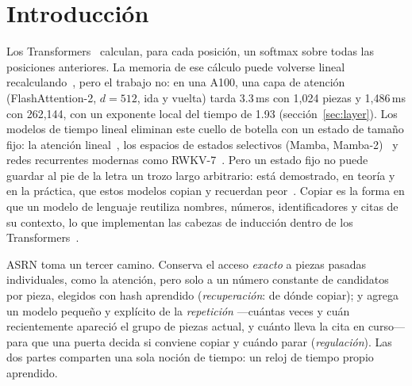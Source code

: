 \documentclass[11pt]{article}
\begin{document}
\section{Introducción}

Los Transformers~\cite{vaswani2017attention} calculan, para cada posición, un softmax sobre todas las posiciones
anteriores. La memoria de ese cálculo puede volverse lineal recalculando~\cite{dao2022flashattention}, pero el trabajo
no: en una A100, una capa de atención (FlashAttention-2, $d=512$, ida y vuelta) tarda 3.3\,ms con 1{,}024 piezas y
1{,}486\,ms con 262{,}144, con un exponente local del tiempo de 1.93 (sección~\ref{sec:layer}). Los modelos de tiempo
lineal eliminan este cuello de botella con un estado de tamaño fijo: la atención
lineal~\cite{katharopoulos2020transformers}, los espacios de estados selectivos (Mamba,
Mamba-2)~\cite{gu2023mamba,dao2024transformers} y redes recurrentes modernas como RWKV-7~\cite{peng2025rwkv7}. Pero un
estado fijo no puede guardar al pie de la letra un trozo largo arbitrario: está demostrado, en teoría y en la práctica,
que estos modelos copian y recuerdan peor~\cite{jelassi2024repeat,arora2023zoology}. Copiar es la forma en que un
modelo de lenguaje reutiliza nombres, números, identificadores y citas de su contexto, lo que implementan las cabezas
de inducción dentro de los Transformers~\cite{olsson2022induction}.

ASRN toma un tercer camino. Conserva el acceso \emph{exacto} a piezas pasadas individuales, como la atención, pero solo
a un número constante de candidatos por pieza, elegidos con hash aprendido (\emph{recuperación}: de dónde copiar); y
agrega un modelo pequeño y explícito de la \emph{repetición} ---cuántas veces y cuán recientemente apareció el grupo de
piezas actual, y cuánto lleva la cita en curso--- para que una puerta decida si conviene copiar y cuándo parar
(\emph{regulación}). Las dos partes comparten una sola noción de tiempo: un reloj de tiempo propio aprendido.
\end{document}
